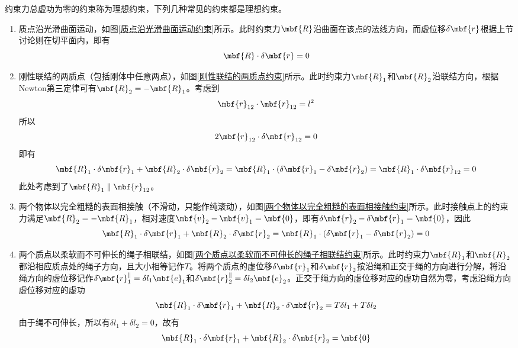 约束力总虚功为零的约束称为{\heiti 理想约束}，下列几种常见的约束都是理想约束。
\begin{enumerate}
	\item 质点沿光滑曲面运动，如图\ref{质点沿光滑曲面运动约束}所示。此时约束力$\mbf{R}$沿曲面在该点的法线方向，而虚位移$\delta \mbf{r}$根据上节讨论则在切平面内，即有
	\begin{equation*}
		\mbf{R} \cdot \delta \mbf{r} = 0
	\end{equation*}
	\item 刚性联结的两质点（包括刚体中任意两点），如图\ref{刚性联结的两质点约束}所示。此时约束力$\mbf{R}_1$和$\mbf{R}_2$沿联结方向，根据Newton第三定律可有$\mbf{R}_2=-\mbf{R}_1$。考虑到
	\begin{equation*}
		\mbf{r}_{12} \cdot \mbf{r}_{12} = l^2
	\end{equation*}
	所以
	\begin{equation*}
		2\mbf{r}_{12} \cdot \delta \mbf{r}_{12} = 0
	\end{equation*}
	即有
	\begin{equation*}
		\mbf{R}_1 \cdot \delta \mbf{r}_1 + \mbf{R}_2 \cdot \delta \mbf{r}_2 = \mbf{R}_1 \cdot (\delta \mbf{r}_1 - \delta \mbf{r}_2) = \mbf{R}_1 \cdot \delta \mbf{r}_{12} = 0
	\end{equation*}
	此处考虑到了$\mbf{R}_1 \parallel \mbf{r}_{12}$。
	\item 两个物体以完全粗糙的表面相接触（不滑动，只能作纯滚动），如图\ref{两个物体以完全粗糙的表面相接触约束}所示。此时接触点上的约束力满足$\mbf{R}_2 =- \mbf{R}_1$，相对速度$\mbf{v}_2-\mbf{v}_1= \mbf{0}$，即有$\delta \mbf{r}_2-\delta \mbf{r}_1 = \mbf{0}$，因此
	\begin{equation*}
		\mbf{R}_1 \cdot \delta \mbf{r}_1 + \mbf{R}_2 \cdot \delta \mbf{r}_2 = \mbf{R}_1 \cdot (\delta \mbf{r}_1 - \delta \mbf{r}_2) = 0
	\end{equation*}
	\item 两个质点以柔软而不可伸长的绳子相联结，如图\ref{两个质点以柔软而不可伸长的绳子相联结约束}所示。此时约束力$\mbf{R}_1$和$\mbf{R}_2$都沿相应质点处的绳子方向，且大小相等记作$T$。将两个质点的虚位移$\delta \mbf{r}_1$和$\delta \mbf{r}_2$按沿绳和正交于绳的方向进行分解，将沿绳方向的虚位移记作$\delta \mbf{r}_1^\parallel = \delta l_1\mbf{e}_1$和$\delta \mbf{r}_2^\parallel = \delta l_2 \mbf{e}_2$。正交于绳方向的虚位移对应的虚功自然为零，考虑沿绳方向虚位移对应的虚功
	\begin{equation*}
		\mbf{R}_1 \cdot \delta \mbf{r}_1 + \mbf{R}_2 \cdot \delta \mbf{r}_2 = T\delta l_1 + T\delta l_2
	\end{equation*}
	由于绳不可伸长，所以有$\delta l_1 + \delta l_2 = 0$，故有
	\begin{equation*}
		\mbf{R}_1 \cdot \delta \mbf{r}_1 + \mbf{R}_2 \cdot \delta \mbf{r}_2 = \mbf{0}
	\end{equation*}
\end{enumerate}
